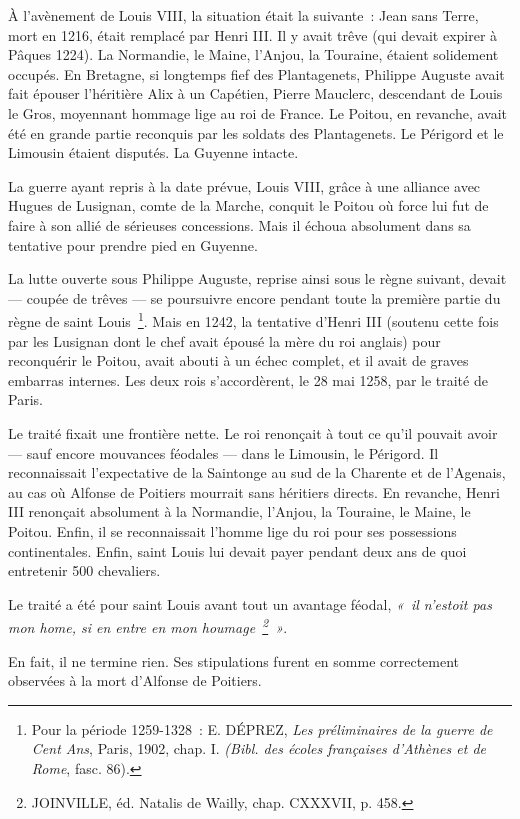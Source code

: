 \documentclass[french,twoside]{book} %
\begin{document}
\noindent À l’avènement de Louis VIII, la situation était la suivante : Jean sans Terre, mort en 1216, était remplacé par Henri III. Il y avait trêve (qui devait expirer à Pâques 1224). La Normandie, le Maine, l’Anjou, la Touraine, étaient solidement occupés. En Bretagne, si longtemps fief des Plantagenets, Philippe Auguste avait fait épouser l’héritière Alix à un Capétien, Pierre Mauclerc, descendant de Louis le Gros, moyennant hommage lige au roi de France. Le Poitou, en revanche, avait été en grande partie reconquis par les soldats des Plantagenets. Le Périgord et le Limousin étaient disputés. La Guyenne intacte.\par
La guerre ayant repris à la date prévue, Louis VIII, grâce à une alliance avec Hugues de Lusignan, comte de la Marche, conquit le Poitou où force lui fut de faire à son allié de sérieuses concessions. Mais il échoua absolument dans sa tentative pour prendre pied en Guyenne.\par
La lutte ouverte sous Philippe Auguste, reprise ainsi sous le règne suivant, devait — coupée de trêves — se poursuivre encore pendant toute la première partie du règne de saint Louis \footnote{ Pour la période 1259-1328 : E. DÉPREZ, {\itshape Les préliminaires de la guerre de Cent Ans}, Paris, 1902, chap. I. {\itshape (Bibl. des écoles françaises d’Athènes et de Rome}, fasc. 86).}. Mais en 1242, la tentative d’Henri III (soutenu cette fois par les Lusignan dont le chef avait épousé la mère du roi anglais) pour reconquérir le Poitou, avait abouti à un échec complet, et il avait de graves embarras internes. Les deux rois s’accordèrent, le 28 mai 1258, par le traité de Paris.\par
Le traité fixait une frontière nette. Le roi renonçait à tout ce qu’il pouvait avoir — sauf encore mouvances féodales — dans le Limousin, le Périgord. Il reconnaissait l’expectative de la Saintonge au sud de la Charente et de l’Agenais, au cas où Alfonse de Poitiers mourrait sans héritiers directs. En revanche, Henri III renonçait absolument à la Normandie, l’Anjou, la Touraine, le Maine, le Poitou. Enfin, il se reconnaissait l’homme lige du roi pour ses possessions continentales. Enfin, saint Louis lui devait payer pendant deux ans de quoi entretenir 500 chevaliers.\par
\label{p23} Le traité a été pour saint Louis avant tout un avantage féodal, \emph{« il n’estoit pas mon home, si en entre en mon houmage \footnote{JOINVILLE, éd. Natalis de Wailly, chap. CXXXVII, p. 458.} »}.\par
En fait, il ne termine rien. Ses stipulations furent en somme correctement observées à la mort d’Alfonse de Poitiers.\par
\end{document}

